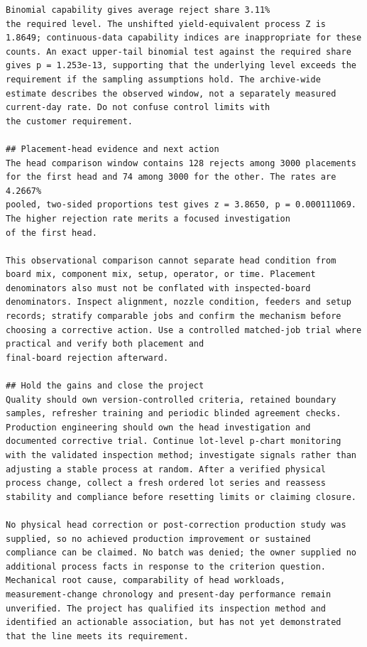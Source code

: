 \begin{lstlisting}[caption={GPT-6-astra on seed 2 under the plain instruction, the report in full.},label={lst:c33-s2-report}]
Binomial capability gives average reject share 3.11%
the required level. The unshifted yield-equivalent process Z is
1.8649; continuous-data capability indices are inappropriate for these
counts. An exact upper-tail binomial test against the required share
gives p = 1.253e-13, supporting that the underlying level exceeds the
requirement if the sampling assumptions hold. The archive-wide
estimate describes the observed window, not a separately measured
current-day rate. Do not confuse control limits with
the customer requirement.

## Placement-head evidence and next action
The head comparison window contains 128 rejects among 3000 placements
for the first head and 74 among 3000 for the other. The rates are
4.2667%
pooled, two-sided proportions test gives z = 3.8650, p = 0.000111069.
The higher rejection rate merits a focused investigation
of the first head.

This observational comparison cannot separate head condition from
board mix, component mix, setup, operator, or time. Placement
denominators also must not be conflated with inspected-board
denominators. Inspect alignment, nozzle condition, feeders and setup
records; stratify comparable jobs and confirm the mechanism before
choosing a corrective action. Use a controlled matched-job trial where
practical and verify both placement and
final-board rejection afterward.

## Hold the gains and close the project
Quality should own version-controlled criteria, retained boundary
samples, refresher training and periodic blinded agreement checks.
Production engineering should own the head investigation and
documented corrective trial. Continue lot-level p-chart monitoring
with the validated inspection method; investigate signals rather than
adjusting a stable process at random. After a verified physical
process change, collect a fresh ordered lot series and reassess
stability and compliance before resetting limits or claiming closure.

No physical head correction or post-correction production study was
supplied, so no achieved production improvement or sustained
compliance can be claimed. No batch was denied; the owner supplied no
additional process facts in response to the criterion question.
Mechanical root cause, comparability of head workloads,
measurement-change chronology and present-day performance remain
unverified. The project has qualified its inspection method and
identified an actionable association, but has not yet demonstrated
that the line meets its requirement.
\end{lstlisting}
